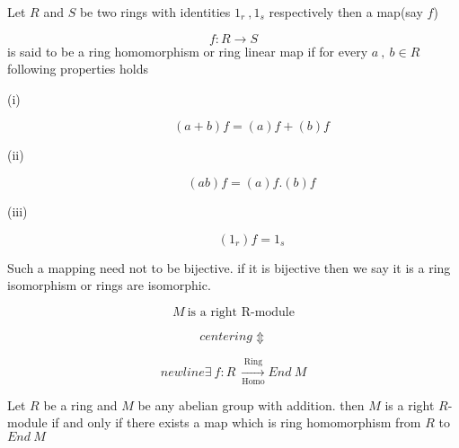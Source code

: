 \begin{defn}
	Let $R$ and $S$ be two rings with identities $1_r \ , 1_s$ respectively then a map(say $f$)

\begin{equation*}
	f : R \rightarrow S
	
\end{equation*}
	is said to be a ring homomorphism or ring linear map if for every $a \ ,\ b \in R$ following properties holds

\begin{description}
		\item[(i) ]

\begin{equation*}
		(a+b)f = (a)f +(b)f
		
\end{equation*}
		\item[(ii)  ]

\begin{equation*}
		(ab)f = (a)f . (b)f
		
\end{equation*}
		\item[(iii) ]

\begin{equation*}
		(1_r)f = 1_s
		
\end{equation*}
	
\end{description}

\end{defn}

\begin{remark}
	Such a mapping need not to be bijective. if it is bijective then we say it is a ring isomorphism or rings are isomorphic.

\end{remark}
\bigskip

\[
M \ \text{is a right R-module} 
\]

\[
centering\Updownarrow 
\]

\[
newline\exists \ f: R \ \xrightarrow[\text{Homo}]{\text{Ring}} End \ M 
\]

\begin{thm}
	Let\marginnote{   } $R$ be a ring and $M$ be any abelian group with addition. then $M$ is a right $R$-module if and only if there exists a map which is ring homomorphism from $R$ to $End \ M$

\end{thm}

